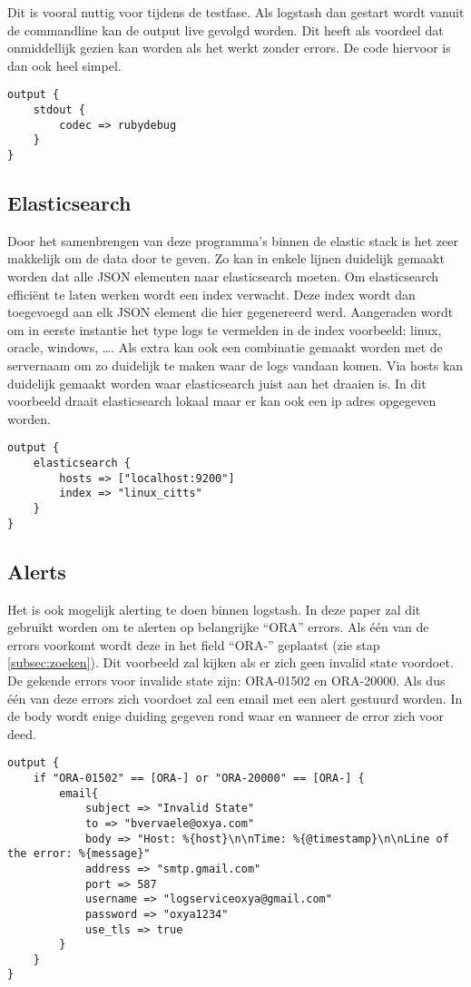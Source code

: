 Dit is vooral nuttig voor tijdens  de testfase. Als logstash dan gestart wordt vanuit de commandline kan de output live gevolgd worden. Dit heeft als voordeel dat onmiddellijk gezien kan worden als het werkt zonder errors. De code hiervoor is dan ook heel simpel.

\lstset{escapechar=@,style=customc}  
\begin{lstlisting}[frame=single]  
output {
	stdout {
		codec => rubydebug 
	}
}
\end{lstlisting}

\subsection{Elasticsearch}
\label{subsec:elasticsearch}

Door het samenbrengen van deze programma’s binnen de elastic stack is het zeer makkelijk om de data door te geven. Zo kan in enkele lijnen duidelijk gemaakt worden dat alle JSON elementen naar elasticsearch moeten. Om elasticsearch efficiënt te laten werken wordt een index verwacht. Deze index wordt dan toegevoegd aan elk JSON element die hier gegenereerd werd. Aangeraden wordt om in eerste instantie het type logs te vermelden in de index voorbeeld: linux, oracle, windows, \dots. Als extra kan ook een combinatie gemaakt worden met de servernaam om zo duidelijk te maken waar de logs vandaan komen. 
Via hosts kan duidelijk  gemaakt worden waar elasticsearch juist aan het draaien is. In dit voorbeeld draait elasticsearch lokaal maar er kan ook een ip adres opgegeven worden.

\lstset{escapechar=@,style=customc}  
\begin{lstlisting}[frame=single]  
output {
	elasticsearch {
		hosts => ["localhost:9200"]
		index => "linux_citts"
	}
}
\end{lstlisting}

\subsection{Alerts}
\label{subsec:alerts}

Het is ook mogelijk alerting te doen binnen logstash. In deze paper zal dit gebruikt worden om te alerten op belangrijke  “ORA” errors. Als één van de errors voorkomt wordt deze in het field “ORA-” geplaatst (zie stap \hyperref[subsec:zoeken]{\ref{subsec:zoeken}}). Dit voorbeeld zal kijken als er zich geen invalid state voordoet. De gekende errors voor invalide state zijn: ORA-01502 en ORA-20000. Als dus één van deze errors zich voordoet zal een email met een alert gestuurd worden. In de body wordt enige duiding gegeven rond waar en wanneer de error zich voor deed.

\lstset{escapechar=@,style=customc}  
\begin{lstlisting}[frame=single]
output {
	if "ORA-01502" == [ORA-] or "ORA-20000" == [ORA-] {
		email{
			subject => "Invalid State"
			to => "bvervaele@oxya.com"
			body => "Host: %{host}\n\nTime: %{@timestamp}\n\nLine of the error: %{message}"
			address => "smtp.gmail.com"
			port => 587
			username => "logserviceoxya@gmail.com"
			password => "oxya1234"
			use_tls => true
		}
	}	 
}

\end{lstlisting}